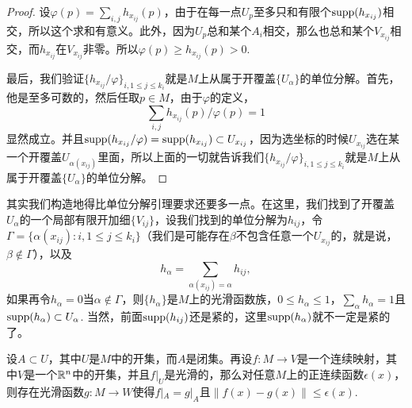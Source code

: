 \begin{proof}
设$\varphi(p)=\sum_{i,j}h_{x_{ij}}(p)$，由于在每一点$U_p$至多只和有限个$\operatorname{supp}(h_{x_{ij}})$相交，所以这个求和有意义。此外，因为$U_p$总和某个$A_i$相交，那么也总和某个$V_{x_{ij}}$相交，而$h_{x_{ij}}$在$V_{x_{ij}}$非零。所以$\varphi(p)\geq h_{x_{ij}}(p)>0$.

最后，我们验证$\{h_{x_{ij}}/\varphi\}_{i,1\leq j\leq k_i}$就是$M$上从属于开覆盖$\{U_\alpha\}$的单位分解。首先，他是至多可数的，然后任取$p\in M$，由于$\varphi$的定义，
\[
	\sum_{i,j}h_{x_{ij}}(p)/\varphi(p)=1
\]
显然成立。并且$\operatorname{supp}(h_{x_{ij}}/\varphi)=\operatorname{supp}(h_{x_{ij}})\subset U_{x_{ij}}$，因为选坐标的时候$U_{x_{ij}}$选在某一个开覆盖$U_{\alpha(x_{ij})}$里面，所以上面的一切就告诉我们$\{h_{x_{ij}}/\varphi\}_{i,1\leq j\leq k_i}$就是$M$上从属于开覆盖$\{U_\alpha\}$的单位分解。
\end{proof}

其实我们构造地得比单位分解引理要求还要多一点。在这里，我们找到了开覆盖$U_{\alpha}$的一个局部有限开加细$\{V_{ij}\}$，设我们找到的单位分解为$h_{ij}$，令$\Gamma=\{\alpha(x_{ij}):i,1\leq j\leq k_i\}$（我们是可能存在$\beta$不包含任意一个$U_{x_{ij}}$的，就是说，$\beta\notin \Gamma$），以及
\[
	h_{\alpha}=\sum_{\alpha(x_{ij})=\alpha}h_{ij},
\]
如果再令$h_{\alpha}=0$当$\alpha\notin \Gamma$，则$\{h_{\alpha}\}$是$M$上的光滑函数族，$0\leq h_\alpha\leq 1$，$\sum_{\alpha}h_\alpha=1$且$\operatorname{supp}(h_\alpha)\subset U_{\alpha}$. 当然，前面$\operatorname{supp}(h_{ij})$还是紧的，这里$\operatorname{supp}(h_\alpha)$就不一定是紧的了。

\begin{lem}
设$A\subset U$，其中$U$是$M$中的开集，而$A$是闭集。再设$f:M\to V$是一个连续映射，其中$V$是一个$\mathbb{R}^n$中的开集，并且$f|_{U}$是光滑的，那么对任意$M$上的正连续函数$\epsilon(x)$，则存在光滑函数$g:M\to W$使得$f|_A=g|_A$且$\|f(x)-g(x)\|\leq \epsilon(x)$.
\end{lem}

